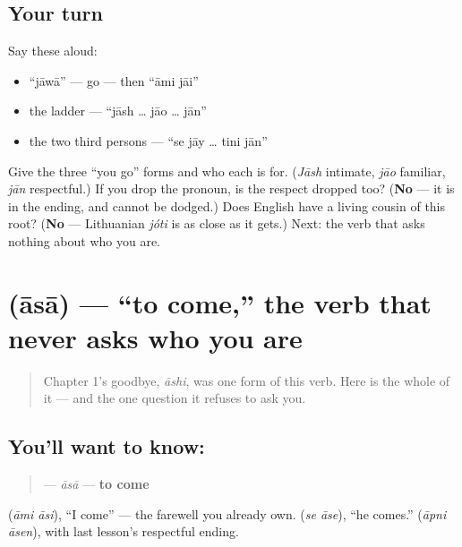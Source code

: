 \subsection*{Your turn}
Say these aloud:

\begin{itemize}
\raggedright
  \item \textquotedblleft{}jāwā\textquotedblright{} — go — then \textquotedblleft{}āmi jāi\textquotedblright{}
  \item the ladder — \textquotedblleft{}jāsh … jāo … jān\textquotedblright{}
  \item the two third persons — \textquotedblleft{}se jāy … tini jān\textquotedblright{}
\end{itemize}

\begin{tcolorbox}[breakable,colback=teal!4,colframe=teal!35!black,title={Before you move on}]
Give the three \textquotedblleft{}you go\textquotedblright{} forms and who each is for. (\emph{Jāsh} intimate, \emph{jāo} familiar, \emph{jān} respectful.) If you drop the pronoun, is the respect dropped too? (\textbf{No} — it is in the ending, and cannot be dodged.) Does English have a living cousin of this root? (\textbf{No} — Lithuanian \emph{jóti} is as close as it gets.) Next: the verb that asks nothing about who you are.
\end{tcolorbox}
\section[āsā]{ (āsā) — \textquotedblleft{}to come,\textquotedblright{} the verb that never asks who you are}

\label{lesson:BN-C07-asha}



\begin{quote}
Chapter 1's goodbye, \emph{āshi}, was one form of this verb. Here is the whole of it — and the one question it refuses to ask you.
\end{quote}

\subsection*{You'll want to know: }
\begin{quote}
\textbf{} — \emph{āsā} — \textbf{to come}
\end{quote}

  (\emph{āmi āsi}), \textquotedblleft{}I come\textquotedblright{} — the farewell you already own.   (\emph{se āse}), \textquotedblleft{}he comes.\textquotedblright{}   (\emph{āpni āsen}), with last lesson's respectful ending.

